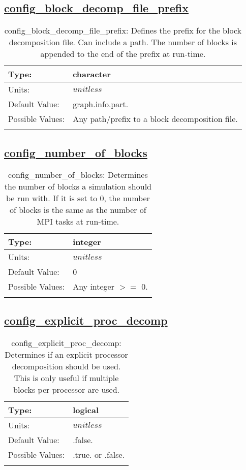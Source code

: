 \subsection[config\_block\_decomp\_file\_prefix]{\hyperref[sec:nm_tab_decomposition]{config\_block\_decomp\_file\_prefix}}
\label{subsec:nm_sec_config_block_decomp_file_prefix}
\begin{center}
\begin{longtable}{| p{2.0in} | p{4.0in} |}
    \hline
    Type: & character \\
    \hline
    Units: & $unitless$ \\
    \hline
    Default Value: & graph.info.part. \\
    \hline
    Possible Values: & Any path/prefix to a block decomposition file. \\
    \hline
    \caption{config\_block\_decomp\_file\_prefix: Defines the prefix for the block decomposition file. Can include a path. The number of blocks is appended to the end of the prefix at run-time.}
\end{longtable}
\end{center}
\subsection[config\_number\_of\_blocks]{\hyperref[sec:nm_tab_decomposition]{config\_number\_of\_blocks}}
\label{subsec:nm_sec_config_number_of_blocks}
\begin{center}
\begin{longtable}{| p{2.0in} | p{4.0in} |}
    \hline
    Type: & integer \\
    \hline
    Units: & $unitless$ \\
    \hline
    Default Value: & 0 \\
    \hline
    Possible Values: & Any integer $>=$ 0. \\
    \hline
    \caption{config\_number\_of\_blocks: Determines the number of blocks a simulation should be run with. If it is set to 0, the number of blocks is the same as the number of MPI tasks at run-time.}
\end{longtable}
\end{center}
\subsection[config\_explicit\_proc\_decomp]{\hyperref[sec:nm_tab_decomposition]{config\_explicit\_proc\_decomp}}
\label{subsec:nm_sec_config_explicit_proc_decomp}
\begin{center}
\begin{longtable}{| p{2.0in} | p{4.0in} |}
    \hline
    Type: & logical \\
    \hline
    Units: & $unitless$ \\
    \hline
    Default Value: & .false. \\
    \hline
    Possible Values: & .true. or .false. \\
    \hline
    \caption{config\_explicit\_proc\_decomp: Determines if an explicit processor decomposition should be used. This is only useful if multiple blocks per processor are used.}
\end{longtable}
\end{center}
